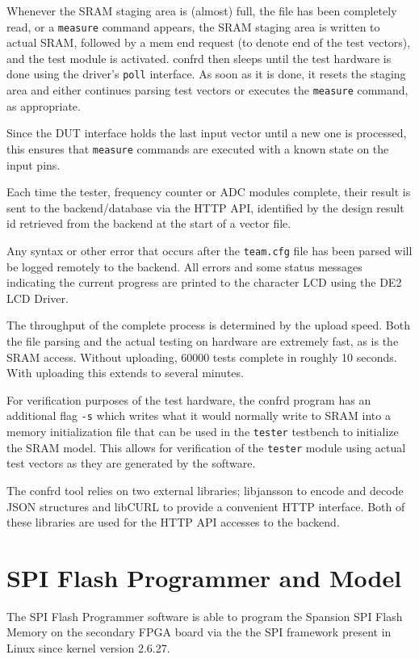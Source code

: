Whenever the SRAM staging area is (almost) full, the file has been completely read, or
a \texttt{measure} command appears, the SRAM staging area is written to actual SRAM, followed
by a mem end request (to denote end of the test vectors), and the test module is activated.
confrd then sleeps until the test hardware is done using the driver's \texttt{poll} interface.
As soon as it is done, it resets
the staging area and either continues parsing test vectors or executes the \texttt{measure}
command, as appropriate.

Since the DUT interface holds the last input vector until a new one is processed,
this ensures that \texttt{measure} commands are executed with a known state on the input pins.

Each time the tester, frequency counter or ADC modules complete, their result
is sent to the backend/database via the HTTP API, identified by the design result id
retrieved from the backend at the start of a vector file.

Any syntax or other error that occurs after the \texttt{team.cfg} file has been parsed
will be logged remotely to the backend. All errors and some status messages indicating
the current progress are printed to the character LCD using the DE2 LCD Driver.

The throughput of the complete process is determined by the upload speed. Both the
file parsing and the actual testing on hardware are extremely fast, as is the SRAM
access. Without uploading, 60000 tests complete in roughly 10 seconds. With uploading
this extends to several minutes.

For verification purposes of the test hardware, the confrd program has an additional flag
\texttt{-s} which writes what it would normally write to SRAM into a memory initialization
file that can be used in the \texttt{tester} testbench to initialize the SRAM model.
This allows for verification of the \texttt{tester} module using actual test vectors
as they are generated by the software.

The confrd tool relies on two external libraries; libjansson to encode and decode
JSON structures and libCURL to provide a convenient HTTP interface. Both of these libraries
are used for the HTTP API accesses to the backend.




\newpage
\section{SPI Flash Programmer and Model}
The SPI Flash Programmer software is able to program the Spansion SPI Flash Memory
on the secondary FPGA board via the the SPI framework present in Linux
since kernel version 2.6.27.

